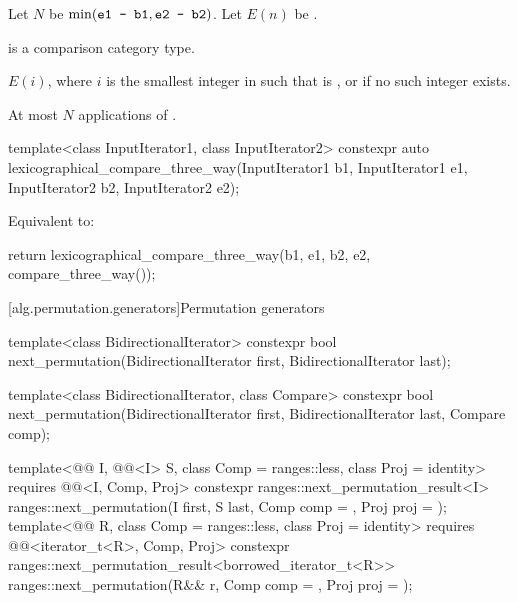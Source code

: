 \begin{itemdescr}
\pnum
Let $N$ be $\min(\texttt{\protect e1 - b1}, \texttt{\protect e2 - b2})$.
Let $E(n)$ be .

\pnum
\mandates
{} is a comparison category type.

\pnum
\returns
$E(i)$, where $i$ is the smallest integer in 
such that  is , or
 if no such integer exists.

\pnum
\complexity
At most $N$ applications of .
\end{itemdescr}

%
\begin{itemdecl}
template<class InputIterator1, class InputIterator2>
  constexpr auto
    lexicographical_compare_three_way(InputIterator1 b1, InputIterator1 e1,
                                      InputIterator2 b2, InputIterator2 e2);
\end{itemdecl}

\begin{itemdescr}
\pnum
\effects
Equivalent to:
\begin{codeblock}
return lexicographical_compare_three_way(b1, e1, b2, e2, compare_three_way());
\end{codeblock}
\end{itemdescr}

[alg.permutation.generators]{Permutation generators}

%
\begin{itemdecl}
template<class BidirectionalIterator>
  constexpr bool next_permutation(BidirectionalIterator first,
                                  BidirectionalIterator last);

template<class BidirectionalIterator, class Compare>
  constexpr bool next_permutation(BidirectionalIterator first,
                                  BidirectionalIterator last, Compare comp);

template<@@ I, @@<I> S, class Comp = ranges::less,
         class Proj = identity>
  requires @@<I, Comp, Proj>
  constexpr ranges::next_permutation_result<I>
    ranges::next_permutation(I first, S last, Comp comp = {}, Proj proj = {});
template<@@ R, class Comp = ranges::less,
         class Proj = identity>
  requires @@<iterator_t<R>, Comp, Proj>
  constexpr ranges::next_permutation_result<borrowed_iterator_t<R>>
    ranges::next_permutation(R&& r, Comp comp = {}, Proj proj = {});
\end{itemdecl}

